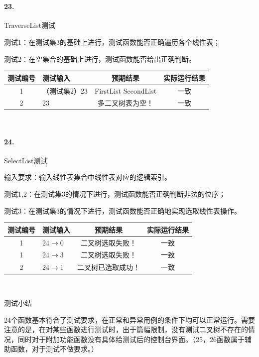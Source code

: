 \documentclass[supercite]{Experimental_Report}
\theoremstyle{definition}
\begin{document}
~\

\paragraph{23.}TraverseList测试
	
测试1：在测试集3的基础上进行，测试函数能否正确遍历各个线性表；

测试2：在空集合的基础上进行，测试函数能否给出正确判断。

\vspace{0.5em}

\begin{tabular}{|c|p{2.7cm}|c|c|}
	\hline
	测试编号 & 测试输入 & 预期结果 & 实际运行结果 \\
	\hline
	1 & （测试集2）23 & FirstList SecondList & 一致 \\
	\hline
	2 & 23 & 多二叉树表为空！ & 一致 \\
	\hline
\end{tabular}

~\

\paragraph{24.}SelectList测试
	
输入要求：输入线性表集合中线性表对应的逻辑索引。
	
测试1,2：在测试集3的情况下进行，测试函数能否正确判断非法的位序；

测试3：在测试集3的情况下进行，测试函数能否正确地实现选取线性表操作。

\vspace{0.5em}

\begin{tabular}{|c|p{2.7cm}|c|c|}
	\hline
	测试编号 & 测试输入 & 预期结果 & 实际运行结果 \\
	\hline
	1 & 24$\rightarrow$0 & 二叉树选取失败！ & 一致 \\
	\hline
	1 & 24$\rightarrow$3 & 二叉树选取失败！ & 一致 \\
	\hline
	2 & 24$\rightarrow$1 & 二叉树已选取成功！ & 一致 \\
	\hline
\end{tabular}

~\

测试小结

24个函数基本符合了测试要求，在正常和异常用例的条件下均可以正常运行。需要注意的是，在对某些函数进行测试时，出于篇幅限制，没有测试二叉树不存在的情况，同时对于附加功能函数没有具体给测试后的控制台界面。（25，26函数属于辅助函数，对于测试不做要求。）
\end{document}
